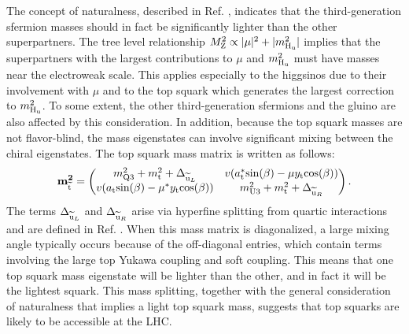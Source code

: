 The concept of naturalness, described in Ref. \cite{NaturalSUSY}, indicates that the third-generation sfermion masses should in fact be significantly lighter than the other superpartners. The tree level relationship $M_{\mathrm{Z}}^{2} \propto |\mu|^{2} + |m_{\mathrm{H}_\mathrm{u}}^{2}|$ implies that the superpartners with the largest contributions to $\mu$ and $m_{\mathrm{H}_\mathrm{u}}^{2}$ must have masses near the electroweak scale. This applies especially to the higgsinos due to their involvement with $\mu$ and to the top squark which generates the largest correction to $m_{\mathrm{H}_\mathrm{u}}^{2}$. To some extent, the other third-generation sfermions and the gluino are also affected by this consideration. In addition, because the top squark masses are not flavor-blind, the mass eigenstates can involve significant mixing between the chiral eigenstates. The top squark mass matrix is written as follows:
\begin{equation}
\mathbf{m_{\widetilde{\mathrm{t}}}^{2}} =
\begin{pmatrix}
m_{\mathrm{Q} 3}^{2} + m_{\mathrm{t}}^{2} + \Delta_{\widetilde{\mathrm{u}}_{L}} & v(a_{\mathrm{t}}^{\ast}\text{sin}(\beta) - \mu y_{\mathrm{t}}\text{cos}(\beta)) \\
v(a_{\mathrm{t}}\text{sin}(\beta) - \mu^{\ast} y_{\mathrm{t}}\text{cos}(\beta)) & m_{\mathrm{U} 3}^{2} + m_{\mathrm{t}}^{2} + \Delta_{\widetilde{\mathrm{u}}_{R}}
\end{pmatrix}.
\end{equation}
The terms $\Delta_{\widetilde{\mathrm{u}}_{L}}$ and $\Delta_{\widetilde{\mathrm{u}}_{R}}$ arise via hyperfine splitting from quartic interactions and are defined in Ref. \cite{Primer}. When this mass matrix is diagonalized, a large mixing angle typically occurs because of the off-diagonal entries, which contain terms involving the large top Yukawa coupling and soft coupling. This means that one top squark mass eigenstate will be lighter than the other, and in fact it will be the lightest squark. This mass splitting, together with the general consideration of naturalness that implies a light top squark mass, suggests that top squarks are likely to be accessible at the LHC.

